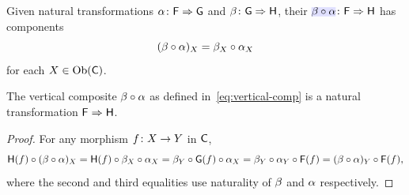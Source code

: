 \documentclass[../preamble]{subfiles}
\begin{document}
\begin{definition}
  \label{def:vertical-composition}
  Given natural transformations
  $\mathsf{\alpha} \colon \mathsf{F} \Rightarrow \mathsf{G}$
  and
  $\mathsf{\beta} \colon \mathsf{G} \Rightarrow \mathsf{H}$,
  their 
  $\newmath{\NatTrans{\beta} \circ \NatTrans{\alpha}} \colon \Functor{F} \Rightarrow \Functor{H}$
  has components
  \begin{equation}
    \label{eq:vertical-comp}
    (\mathsf{\beta} \circ \mathsf{\alpha})_X = \mathsf{\beta}_X \circ \mathsf{\alpha}_X
  \end{equation}
  for each $X \in \operatorname{Ob}(\mathsf{C})$.
\end{definition}

\begin{proposition}
  \label{prop:vertical-comp-nat}
  The vertical composite $\mathsf{\beta} \circ \mathsf{\alpha}$
  as defined in~\eqref{eq:vertical-comp} is a natural transformation
  $\mathsf{F} \Rightarrow \mathsf{H}$.
\end{proposition}

\begin{proof}
  For any morphism $f \colon X \lto Y$ in $\mathsf{C}$,
  \[
    \mathsf{H}(f) \circ (\mathsf{\beta} \circ \mathsf{\alpha})_X
    = \mathsf{H}(f) \circ \mathsf{\beta}_X \circ \mathsf{\alpha}_X
    = \mathsf{\beta}_Y \circ \mathsf{G}(f) \circ \mathsf{\alpha}_X
    = \mathsf{\beta}_Y \circ \mathsf{\alpha}_Y \circ \mathsf{F}(f)
    = (\mathsf{\beta} \circ \mathsf{\alpha})_Y \circ \mathsf{F}(f),
  \]
  where the second and third equalities use naturality of $\mathsf{\beta}$
  and $\mathsf{\alpha}$ respectively.
\end{proof}
\end{document}
